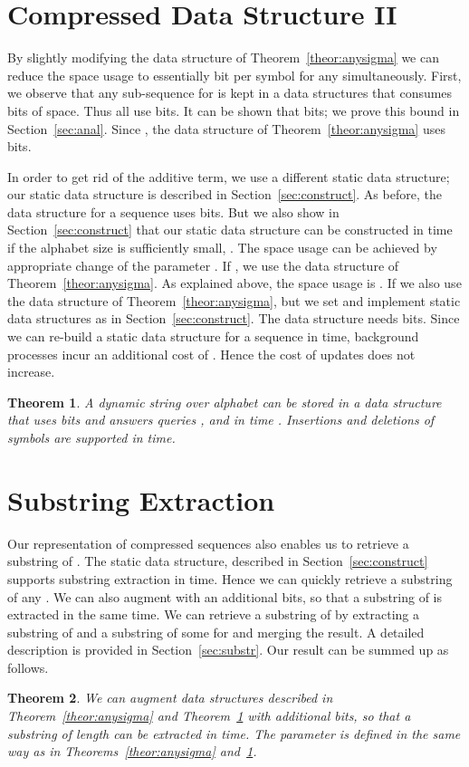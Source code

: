 \documentclass[11pt]{article}\usepackage{fullpage}
\newtheorem{theorem}{Theorem}
\begin{document}
\section{Compressed Data Structure II}
\label{sec:compr2}
By slightly modifying the data structure of Theorem~\ref{theor:anysigma} we can reduce the space usage to essentially  bit per symbol for any   simultaneously. First, we observe that any sub-sequence  for  is kept in a data structures that consumes  bits of space. Thus all  use  bits.  It can be shown that 
 bits; we prove this bound in Section~\ref{sec:anal}.  Since , the data structure of Theorem~\ref{theor:anysigma} uses  bits. 

In order to get rid of the  additive term, we use a different static data structure;  our static data structure is described in Section~\ref{sec:construct}. As before, the data structure for a sequence  uses   bits.   But we also show in Section~\ref{sec:construct} that our static data structure can be constructed in  time if the alphabet size  is sufficiently small, .   The space usage  can be achieved by appropriate change of the parameter .  
If , we use the data structure of Theorem~\ref{theor:anysigma}.  As explained above, the space usage is .
If  we  also use the data structure of Theorem~\ref{theor:anysigma}, but we set  and implement static data structures as in  Section~\ref{sec:construct}. The data structure needs 
 bits. Since we can re-build a static data structure for a sequence  in  time, background processes incur an additional cost of . Hence the cost of updates does not increase.
 \begin{theorem}
  \label{theor:anysigma2}
A dynamic string   over alphabet  
can be stored in a data structure that uses  bits and answers queries ,  and  in time .
Insertions and deletions of symbols are supported in  time. 
\end{theorem}

\section{Substring Extraction}
\label{sec:substr0}
Our representation of compressed sequences also enables us to retrieve a substring  of .
The static data structure, described in Section~\ref{sec:construct} supports substring extraction in  time. Hence we can quickly retrieve a substring of any . We can also augment  with an  additional bits, so that a substring of  is extracted in the same time.
We can retrieve a substring of  by extracting a substring of  and a substring of some  for  and merging the result. A detailed description is provided in Section~\ref{sec:substr}.  Our  result can be summed up as follows.
\begin{theorem}
  \label{theor:substr}
We can augment  data structures described in Theorem~\ref{theor:anysigma} and Theorem~\ref{theor:anysigma2} with 
 additional bits, so that a substring of length  can be extracted in  time. The parameter  is defined in the same way as in Theorems~\ref{theor:anysigma} and~\ref{theor:anysigma2}. 
\end{theorem}
\end{document}
